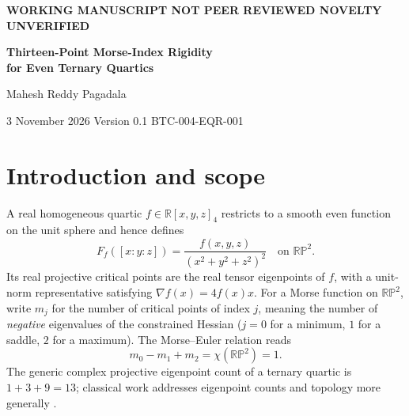 \documentclass[10pt,a4paper]{article}
\theoremstyle{plain}
\theoremstyle{remark}
\newcommand{\RP}{\mathbb{RP}}
\begin{document}
\begin{center}
{\small\bfseries\color{muted} WORKING MANUSCRIPT \textemdash{} NOT PEER REVIEWED \textemdash{} NOVELTY UNVERIFIED}\par\vspace{8pt}
{\LARGE\bfseries\color{ink} Thirteen-Point Morse-Index Rigidity\\[4pt] for Even Ternary Quartics}\par\vspace{12pt}
{\large Mahesh Reddy Pagadala}\par\vspace{4pt}
{\small 3 November 2026 \quad\textbar\quad Version 0.1 \quad\textbar\quad BTC-004-EQR-001}\par
\end{center}
\vspace{4pt}
\begin{abstract}
Let $f$ be a real homogeneous ternary quartic containing only monomials even in each coordinate, with arbitrary coefficients. We prove that, if its normalized function on $\RP^2$ is Morse and has thirteen distinct real critical points, then its Morse-index counts $(m_0,m_1,m_2)$ are necessarily $(4,6,3)$ or $(3,6,4)$; both occur. The proof passes to squared coordinates on the standard two-simplex, where the function becomes quadratic. A determinant identity relates the edge curvature, transverse derivative and interior Hessian and yields an exhaustive index classification. The conclusion excludes four other arithmetically admissible thirteen-point triples \emph{within this even-power family}; it makes no assertion of impossibility for general ternary quartics. This manuscript is an internal, AI-assisted research draft. Independent human review and comprehensive prior-art verification remain outstanding.
\end{abstract}

\section{Introduction and scope}
A real homogeneous quartic $f\in\mathbb R[x,y,z]_4$ restricts to a smooth even function on the unit sphere and hence defines
\begin{equation}\label{eq:F}
 F_f([x:y:z])=\frac{f(x,y,z)}{(x^2+y^2+z^2)^2}\quad\text{on }\RP^2.
\end{equation}
Its real projective critical points are the real tensor eigenpoints of $f$, with a unit-norm representative satisfying $\nabla f(x)=4f(x)x$. For a Morse function on $\RP^2$, write $m_j$ for the number of critical points of index $j$, meaning the number of \emph{negative} eigenvalues of the constrained Hessian ($j=0$ for a minimum, $1$ for a saddle, $2$ for a maximum). The Morse--Euler relation reads
\begin{equation}\label{eq:euler}
 m_0-m_1+m_2=\chi(\RP^2)=1.
\end{equation}
The generic complex projective eigenpoint count of a ternary quartic is $1+3+9=13$; classical work addresses eigenpoint counts and topology more generally \cite{cartwright2013,abo2017,maccioni2018,bassotu2020,kozhasov2018}.
\end{document}
